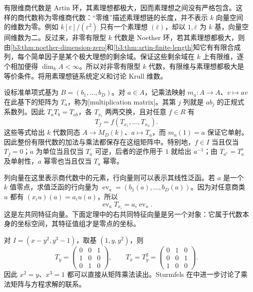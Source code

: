 有限维商代数是 Artin 环，其素理想都极大，因而素理想之间没有严格包含。这样的商代数称为零维商代数：“零维”描述素理想链的长度，并不表示 \(k\) 向量空间的维数为零。例如 \(k[\varepsilon]/(\varepsilon^2)\) 只有一个素理想 \((\bar\varepsilon)\)，却以 \(1,\bar\varepsilon\) 为 \(k\) 基，向量空间维数为二。反过来，非零有限型 \(k\) 代数是 Noether 环，若其素理想都极大，则由\cref{b3:thm:noether-dimension-zero}和\cref{b3:thm:artin-finite-length}知它有有限合成列，每个简单因子是某个极大理想的剩余域。保证这些剩余域在 \(k\) 上有限维，逐个相加便得 \(\dim_k A<\infty\)。所以对非零有限型 \(k\) 代数，有限维与素理想都极大是等价条件。将用素理想链系统定义和讨论 Krull 维数。

\ProseParagraphBreak
设标准单项式基为 \(B=(b_1,\ldots,b_D)\)。对 \(a\in A\)，记乘法映射 \(m_a:A\to A\)、\(v\mapsto av\) 在此基下的矩阵为 \(T_a\)，称为[multiplication matrix]。其第 \(j\) 列就是 \(ab_j\) 的正规式系数列。因此 \(T_aT_b=T_{ab}\)，各 \(T_{x_i}\) 两两交换，且对任意 \(f\in R\) 有
\[
	T_{\bar f}=f(T_{x_1},\ldots,T_{x_n}).
\]
这些等式给出 \(k\) 代数同态 \(A\to M_D(k)\)、\(a\mapsto T_a\)，而 \(m_a(1)=a\) 保证它单射。因此整份有限代数的加法与乘法都保存在这组矩阵中。特别地，\(f\in I\) 当且仅当 \(T_{\bar f}=0\)；\(a\) 为单位当且仅当 \(T_a\) 可逆，后者的逆作用于 \(1\) 就给出 \(a^{-1}\)；由 \(T_{a^r}=T_a^r\) 及单射性，\(a\) 幂零也当且仅当 \(T_a\) 幂零。

\ProseParagraphBreak
列向量在这里表示商代数中的元素，行向量则可以表示其线性泛函。若 \(a\) 是一个 \(k\) 值零点，求值泛函的行向量为 \(\operatorname{ev}_a=(b_1(a),\ldots,b_D(a))\)。因为对任意商类 \(u\) 都有 \((x_i u)(a)=a_i u(a)\)，所以
\[
	\operatorname{ev}_a T_{x_i}=a_i\operatorname{ev}_a.
\]
这是左共同特征向量。下面定理中的右共同特征向量是另一个对象：它属于代数本身的坐标空间，其特征值组才是零点的坐标。

\ProseParagraphBreak
对 \(I=(x-y^2,y^3-1)\)，取基 \((1,y,y^2)\)，则
\[
	T_y=\begin{pmatrix}0&0&1\\1&0&0\\0&1&0\end{pmatrix},
	\qquad T_x=T_y^2=\begin{pmatrix}0&1&0\\0&0&1\\1&0&0\end{pmatrix}.
\]
因此 \(x^2=y\)、\(x^3=1\) 都可以直接从矩阵乘法读出。Sturmfels 在\cite[Section 2.3, pp. 17--19]{Sturmfels2002PolynomialEquations}中进一步讨论了乘法矩阵与方程求解的联系。


